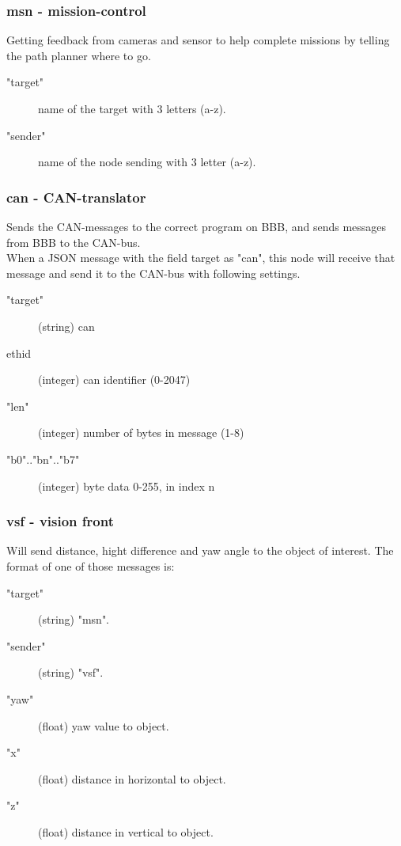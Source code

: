 \subsubsection{msn - mission-control}
Getting feedback from cameras and sensor to help complete missions by telling the path planner where to go.
\begin{description}
  \item["target"] name of the target with 3 letters (a-z).
  \item["sender"] name of the node sending  with 3 letter (a-z).
\end{description}

\subsubsection{can - CAN-translator}
Sends the CAN-messages to the correct program on BBB, and sends messages from BBB to the CAN-bus.\\
When a JSON message with the field target as "can", this node will receive that message and send it to the CAN-bus with following settings.
\begin{description}
  \item["target"] (string) can
  \item[ethid] (integer) can identifier (0-2047)
  \item["len"] (integer) number of bytes in message (1-8)
  \item["b0".."bn".."b7"] (integer) byte data 0-255, in index n
\end{description}

\subsubsection{vsf - vision front}
Will send distance, hight difference and yaw angle to the object of interest.
The format of one of those messages is:
\begin{description}
  \item["target"] (string) "msn".
  \item["sender"] (string) "vsf".
  \item["yaw"] (float) yaw value to object.
  \item["x"] (float) distance in horizontal to object.
  \item["z"] (float) distance in vertical to object.
\end{description}

